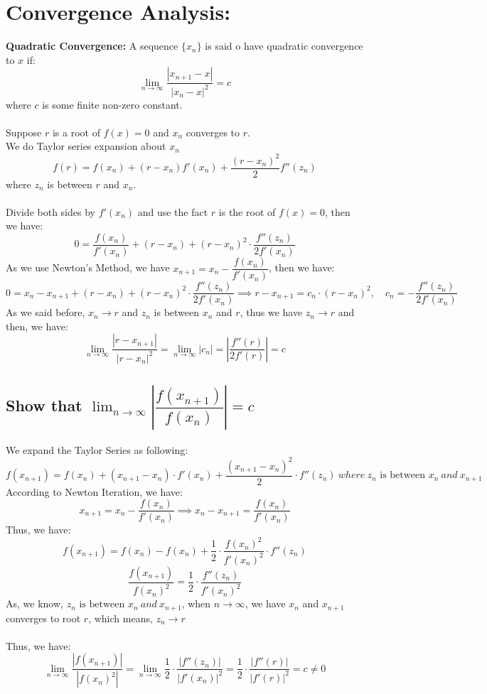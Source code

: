 \documentclass [9 pt]{article}
\theoremstyle{definition}
\begin{document}
\newpage
\section*{Convergence Analysis:}
\textbf{Quadratic Convergence:}
A sequence $\{ x_n \}$ is said o have quadratic convergence to $x$ if:
$$ \lim_{n \to \infty} \dfrac{|x_{n+1} - x|}{ |x_n - x|^2 } = c $$
where $c$ is some finite non-zero constant.\\
\\
Suppose $r$ is a root of $f(x) = 0$ and $x_n$ converges to $r$.\\
We do Taylor series expansion about $x_n$
$$f(r) = f(x_n) + (r - x_n) f'(x_n) + \dfrac{(r - x_n)^2}{2} f''(z_n)$$
where $z_n$ is between $r$ and $x_n$.\\
\\
Divide both sides by $f'(x_n)$ and use the fact $r$ is the root of $f(x) = 0$, then we have:
$$ 0 = \dfrac{f(x_n)}{f'(x_n)} + (r - x_n) + (r - x_n)^2 \cdot \dfrac{f''(z_n)}{2f'(x_n)} $$
As we use Newton's Method, we have $x_{n+1} = x_n - \dfrac{f(x_n)}{f'(x_n)} $, then we have:
$$ 0 = x_n - x_{n+1} + (r - x_n) + (r - x_n)^2 \cdot \dfrac{f''(z_n)}{2f'(x_n)} \implies r - x_{n+1} = c_n \cdot (r - x_n)^2, \quad c_n = - \dfrac{f''(z_n)}{2f'(x_n)} $$
As we said before, $x_n \to r$ and $z_n $ is between $x_n$ and $r$, thus we have $z_n \to r$ and then, we have:
$$ \lim_{n \to \infty} \dfrac{|r - x_{n+1}|}{ |r - x_n|^2 } = \lim_{n \to \infty} |c_n| = |\dfrac{f''(r)}{2f'(r)}|  = c $$

\subsection*{Show that $\lim_{n\to \infty} | \dfrac{f(x_{n+1})}{f(x_n)} | = c$}
\begin{mdframed}
	We expand the Taylor Series as following:
$$ f(x_{n+1}) = f(x_n) + (x_{n+1} - x_n )\cdot f'(x_n) + \dfrac{(x_{n+1} - x_{n})^2}{2}\cdot f''(z_n)\ where\  z_n \text{ is between } x_n \ and\ x_{n+1} $$
According to Newton Iteration, we have:
$$ x_{n+1} = x_n - \dfrac{f(x_n)}{f'(x_n)}  \implies x_n - x_{n+1} =   \dfrac{f(x_n)}{f'(x_n)}  $$
Thus, we have:
$$ f(x_{n+1}) = f(x_n) - f(x_n) + \dfrac{ 1 }{2} \cdot \dfrac{f(x_n)^2}{f'(x_n)^2} \cdot  f''(z_n)  $$
$$ \dfrac{f(x_{n+1})}{f(x_n)^2} = \dfrac{1}{2} \cdot \dfrac{f''(z_n)}{f'(x_n)^2} $$
As, we know, $  z_n \text{ is between } x_n \ and\ x_{n+1} $, when $n \to \infty$, we have $x_n$ and $x_{n+1}$ converges to root $r$, which means, $z_n \to r$\\
\\
Thus, we have:
$$ \lim_{n \to \infty}  \dfrac{|f(x_{n+1})|}{|f(x_n)^2|} = \lim_{n \to \infty} \dfrac{1}{2} \cdot \dfrac{|f''(z_n)|}{|f'(x_n)|^2} = \dfrac{1}{2} \cdot \dfrac{|f''(r)|}{|f'(r)|^2} = c \neq 0 $$
\end{mdframed}
\end{document}
